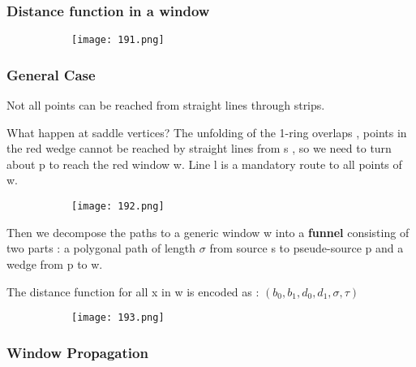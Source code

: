 \documentclass{article}
\begin{document}
\vspace{20mm}

\subsubsection{Distance function in a window}

  \begin{figure}[ht!]
  \centering
  \begin{subfigure}[b]{0.8\linewidth}
    \texttt{[image: 191.png]}
  \end{subfigure}
\end{figure}

\subsubsection{General Case}

Not all points can be reached from straight lines through strips.

What happen at saddle vertices? The unfolding of the 1-ring overlaps , points in the red wedge cannot be reached by straight lines from s , so we need to turn about p to reach the red window w. Line l is a mandatory route to all points of w.

  \begin{figure}[ht!]
  \centering
  \begin{subfigure}[b]{0.4\linewidth}
    \texttt{[image: 192.png]}
  \end{subfigure}
\end{figure}

Then we decompose the paths to a generic window w into a \textbf{funnel} consisting of two parts : a polygonal path of length $\sigma$ from source s to pseude-source p and a wedge from p to w.

\vspace{30mm}

The distance function for all x in w is encoded as : $(b_0,b_1,d_0,d_1,\sigma,\tau)$

  \begin{figure}[ht!]
  \centering
  \begin{subfigure}[b]{0.5\linewidth}
    \texttt{[image: 193.png]}
  \end{subfigure}
\end{figure}

\subsubsection{Window Propagation}
\end{document}
